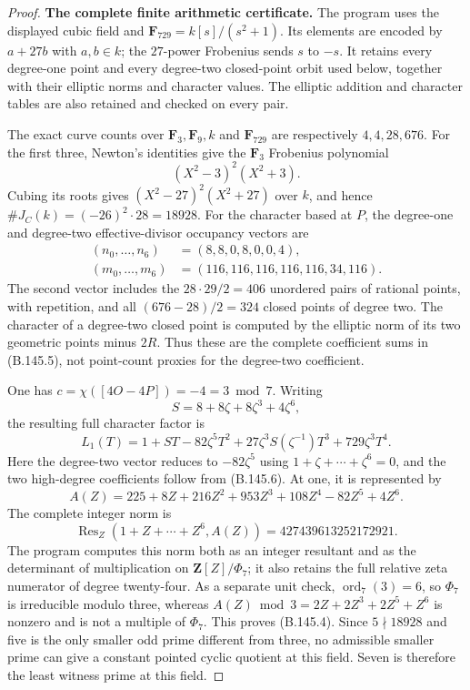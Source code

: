 \begin{proof}
\medskip\noindent\textbf{The complete finite arithmetic certificate.}
The program 
uses the displayed cubic field and
$\mathbf F_{729}=k[s]/(s^2+1)$.
Its elements are encoded by $a+27b$ with $a,b\in k$;
the $27$-power Frobenius sends $s$ to $-s$.
It retains every degree-one point and every degree-two
closed-point orbit used below, together with their elliptic
norms and character values.
The elliptic addition and character tables are also retained
and checked on every pair.

The exact curve counts over $\mathbf F_3,\mathbf F_9,k$ and
$\mathbf F_{729}$ are respectively $4,4,28,676$.
For the first three, Newton's identities give the
$\mathbf F_3$ Frobenius polynomial
\[
                         (X^2-3)^2(X^2+3).
\]
Cubing its roots gives $(X^2-27)^2(X^2+27)$ over $k$,
and hence $\#J_C(k)=(-26)^2\cdot28=18928$.
For the character based at $P$, the degree-one and
degree-two effective-divisor occupancy vectors are
\[
\begin{split}
 (n_0,\ldots,n_6)&=(8,8,0,8,0,0,4),\\
 (m_0,\ldots,m_6)&=(116,116,116,116,116,34,116).
\end{split}                                                   \tag{B.145.11}
\]
The second vector includes the $28\cdot29/2=406$ unordered
pairs of rational points, with repetition, and all
$(676-28)/2=324$ closed points of degree two.
The character of a degree-two closed point is computed by
the elliptic norm of its two geometric points minus $2R$.
Thus these are the complete coefficient sums in (B.145.5),
not point-count proxies for the degree-two coefficient.

One has $c=\chi([4O-4P])=-4=3\bmod7$.
Writing
\[
       S=8+8\zeta+8\zeta^3+4\zeta^6,
\]
the resulting full character factor is
\[
 L_1(T)=1+ST-82\zeta^5T^2+
             27\zeta^3 S(\zeta^{-1})T^3+729\zeta^3T^4 .
                                                            \tag{B.145.12}
\]
Here the degree-two vector reduces to $-82\zeta^5$
using $1+\zeta+\cdots+\zeta^6=0$, and the two high-degree
coefficients follow from (B.145.6).
At one, it is represented by
\[
 A(Z)=225+8Z+216Z^2+953Z^3+108Z^4-82Z^5+4Z^6 .
\]
The complete integer norm is
\[
 \operatorname{Res}_Z(1+Z+\cdots+Z^6,A(Z))
                         =427439613252172921 .
                                                            \tag{B.145.13}
\]
The program computes this norm both as an integer resultant
and as the determinant of multiplication on
$\mathbf Z[Z]/\Phi_7$; it also retains the full relative
zeta numerator of degree twenty-four.
As a separate unit check, $\operatorname{ord}_7(3)=6$,
so $\Phi_7$ is irreducible modulo three, whereas
$A(Z)\bmod3=2Z+2Z^3+2Z^5+Z^6$ is nonzero and is not
a multiple of $\Phi_7$.
This proves (B.145.4).
Since $5\nmid18928$ and five is the only smaller odd prime
different from three, no admissible smaller prime can give
a constant pointed cyclic quotient at this field.
Seven is therefore the least witness prime at this field.


\end{proof}
